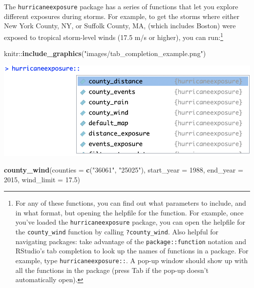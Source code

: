 \documentclass[]{tufte-book}
\newenvironment{Shaded}{}{}
\newcommand{\DataTypeTok}[1]{\textcolor[rgb]{0.56,0.13,0.00}{#1}}
\newcommand{\DecValTok}[1]{\textcolor[rgb]{0.25,0.63,0.44}{#1}}
\newcommand{\FloatTok}[1]{\textcolor[rgb]{0.25,0.63,0.44}{#1}}
\newcommand{\KeywordTok}[1]{\textcolor[rgb]{0.00,0.44,0.13}{\textbf{#1}}}
\newcommand{\NormalTok}[1]{#1}
\newcommand{\OperatorTok}[1]{\textcolor[rgb]{0.40,0.40,0.40}{#1}}
\newcommand{\StringTok}[1]{\textcolor[rgb]{0.25,0.44,0.63}{#1}}
\begin{document}
The \texttt{hurricaneexposure} package has a series of functions that let you explore different
exposures during storms. For example, to get the storms where either New York County, NY,
or Suffolk County, MA, (which includes Boston) were exposed to tropical storm-level winds
(17.5 m/s or higher), you can run:\footnote{For any of these functions, you can find out what parameters
  to include, and in what format, but opening the helpfile for the function. For example, once you've
  loaded the \texttt{hurricaneexposure} package, you can open the helpfile for the \texttt{county\_wind} function
  by calling \texttt{?county\_wind}. Also helpful for navigating packages: take advantage of the \texttt{package::function}
  notation and RStudio's tab completion to look up the names of functions in a package. For example,
  type \texttt{hurricaneexposure::}. A pop-up window should show up with all the functions in the package (press
  Tab if the pop-up doesn't automatically open).}

\begin{Shaded}
\begin{Highlighting}[]
\NormalTok{knitr}\OperatorTok{::}\KeywordTok{include_graphics}\NormalTok{(}\StringTok{"images/tab_completion_example.png"}\NormalTok{)}
\end{Highlighting}
\end{Shaded}

\begin{marginfigure}
\includegraphics[width=13.68in]{images/tab_completion_example} \end{marginfigure}

\begin{Shaded}
\begin{Highlighting}[]
\KeywordTok{county_wind}\NormalTok{(}\DataTypeTok{counties =} \KeywordTok{c}\NormalTok{(}\StringTok{"36061"}\NormalTok{, }\StringTok{"25025"}\NormalTok{), }\DataTypeTok{start_year =} \DecValTok{1988}\NormalTok{, }
    \DataTypeTok{end_year =} \DecValTok{2015}\NormalTok{, }\DataTypeTok{wind_limit =} \FloatTok{17.5}\NormalTok{)}
\end{Highlighting}
\end{Shaded}
\end{document}
